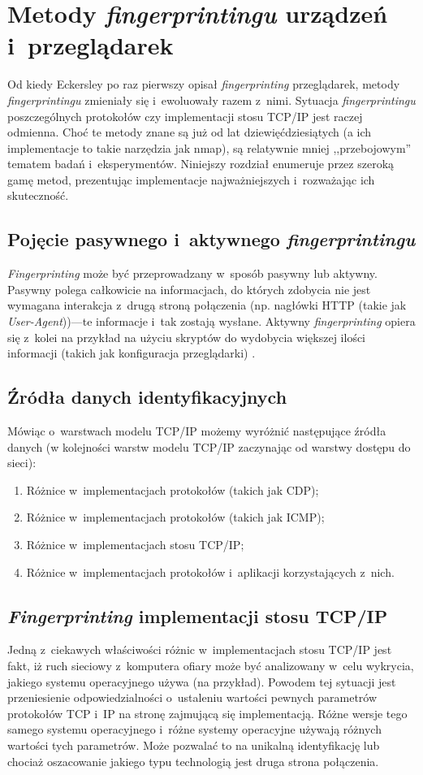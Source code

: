 \chapter{Metody \emph{fingerprintingu} urządzeń i~przeglądarek}
Od kiedy Eckersley \cite{eckersley2010unique} po raz pierwszy opisał
\emph{fingerprinting} przeglądarek, metody \emph{fingerprintingu} zmieniały się
i~ewoluowały razem z~nimi. Sytuacja \emph{fingerprintingu} poszczególnych
protokołów czy implementacji stosu TCP/IP jest raczej odmienna. Choć te metody
znane są już od lat dziewięćdziesiątych (a ich implementacje to takie narzędzia
jak nmap), są relatywnie mniej ,,przebojowym'' tematem badań i~eksperymentów.
Niniejszy rozdział enumeruje przez szeroką gamę metod, prezentując implementacje
najważniejszych i~rozważając ich skuteczność.

\section{Pojęcie pasywnego i~aktywnego \emph{fingerprintingu}}
\emph{Fingerprinting} może być przeprowadzany w~sposób pasywny lub aktywny.
Pasywny polega całkowicie na informacjach, do których zdobycia nie jest wymagana
interakcja z~drugą stroną połączenia (np. nagłówki HTTP (takie jak
\emph{User-Agent}))---te informacje i~tak zostają wysłane. Aktywny
\emph{fingerprinting} opiera się z~kolei na przykład na użyciu skryptów do
wydobycia większej ilości informacji (takich jak konfiguracja przeglądarki)
\cite[s. 3]{al2020too}.

\section{Źródła danych identyfikacyjnych}
Mówiąc o~warstwach modelu TCP/IP możemy wyróżnić następujące źródła danych (w
kolejności warstw modelu TCP/IP zaczynając od warstwy dostępu do sieci):
\begin{enumerate}
	\item Różnice w~implementacjach protokołów (takich jak CDP);
	\item Różnice w~implementacjach protokołów (takich jak ICMP);
	\item Różnice w~implementacjach stosu TCP/IP;
	\item Różnice w~implementacjach protokołów i~aplikacji korzystających
	      z~nich.
\end{enumerate}

\section{\emph{Fingerprinting} implementacji stosu TCP/IP}
Jedną z~ciekawych właściwości różnic w~implementacjach stosu TCP/IP jest fakt,
iż ruch sieciowy z~komputera ofiary może być analizowany w~celu wykrycia,
jakiego systemu operacyjnego używa (na przykład). Powodem tej sytuacji jest
przeniesienie odpowiedzialności o~ustaleniu wartości pewnych parametrów
protokołów TCP i~IP na stronę zajmującą się implementacją. Różne wersje tego
samego systemu operacyjnego i~różne systemy operacyjne używają różnych wartości
tych parametrów. Może pozwalać to na unikalną identyfikację lub chociaż
oszacowanie jakiego typu technologią jest druga strona połączenia.

